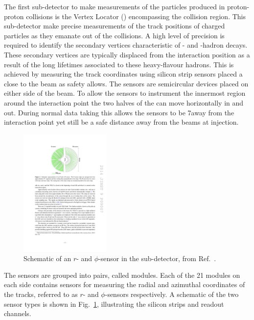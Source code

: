 The first sub-detector to make measurements of the particles produced in proton-proton collisions is the Vertex Locator (\velo) encompassing the collision region. This sub-detector make precise measurements of the track positions of charged particles as they emanate out of the collisions. A high level of precision is required to identify the secondary vertices characteristic of \bquark- and \cquark-hadron decays. These secondary vertices are typically displaced from the interaction position as a result of the long lifetimes associated to these heavy-flavour hadrons. This is achieved by measuring the track coordinates using silicon strip sensors placed a close to the \lhc beam as safety allows. The \velo sensors are semicircular devices placed on either side of the beam. To allow the sensors to instrument the innermost region around the interaction point the two halves of the \velo can move horizontally in and out. During normal data taking this allows the sensors to be 7\mm away from the interaction point yet still be a safe distance away from the beams at injection. 

\begin{figure}[!h]
    \centering   
    \includegraphics[width=0.4\textwidth]{figs/Detector/velo_r_phi_sensor.pdf}
    \caption{Schematic of an $r$- and $\phi$-sensor in the \velo sub-detector, from Ref.~\cite{LHCb-DP-2014-001}.}
    \label{fig:Dec_r_phi_sensor}   
\end{figure}

The sensors are grouped into pairs, called modules. Each of the 21 modules on each side contains sensors for measuring the radial and azimuthal coordinates of the tracks, referred to as $r$- and $\phi$-sensors respectively. A schematic of the two sensor types is shown in Fig.~\ref{fig:Dec_r_phi_sensor}, illustrating the silicon strips and readout channels. 



